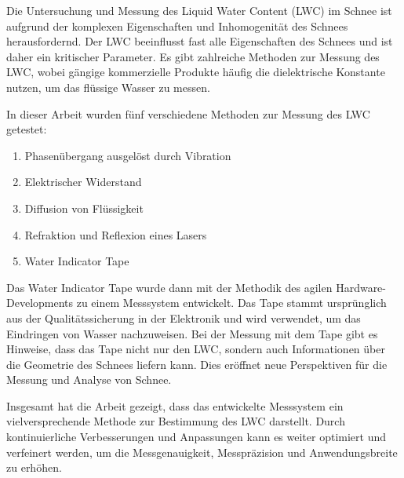 
Die Untersuchung und Messung des Liquid Water Content (LWC) im Schnee ist aufgrund der komplexen Eigenschaften und Inhomogenität des Schnees herausfordernd. Der LWC beeinflusst fast alle Eigenschaften des Schnees und ist daher ein kritischer Parameter. Es gibt zahlreiche Methoden zur Messung des LWC, wobei gängige kommerzielle Produkte häufig die dielektrische Konstante nutzen, um das flüssige Wasser zu messen. 

In dieser Arbeit wurden fünf verschiedene Methoden zur Messung des LWC getestet:

\begin{enumerate}
    \item Phasenübergang ausgelöst durch Vibration
    \item Elektrischer Widerstand
    \item Diffusion von Flüssigkeit
    \item Refraktion und Reflexion eines Lasers
    \item Water Indicator Tape
\end{enumerate}

Das Water Indicator Tape wurde dann mit der Methodik des agilen Hardware-Developments zu einem Messsystem entwickelt. Das Tape stammt ursprünglich aus der Qualitätssicherung in der Elektronik und wird verwendet, um das Eindringen von Wasser nachzuweisen. Bei der Messung mit dem Tape gibt es Hinweise, dass das Tape nicht nur den LWC, sondern auch Informationen über die Geometrie des Schnees liefern kann. Dies eröffnet neue Perspektiven für die Messung und Analyse von Schnee.

Insgesamt hat die Arbeit gezeigt, dass das entwickelte Messsystem ein vielversprechende Methode zur Bestimmung des LWC darstellt. Durch kontinuierliche Verbesserungen und Anpassungen kann es weiter optimiert und verfeinert werden, um die Messgenauigkeit, Messpräzision und Anwendungsbreite zu erhöhen.

